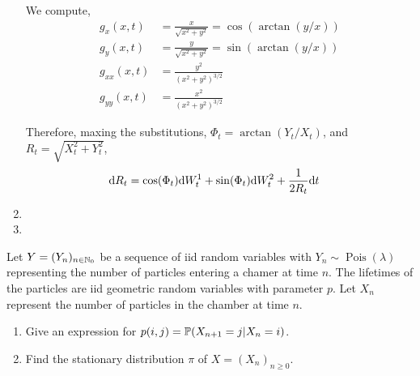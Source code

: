 \begin{solution}[Solution]
\begin{enumerate}[label=(\alph*)]
        We compute,
        \begin{align*}
            g_x(x,t) &= \frac{x}{\sqrt{x^2+y^2}} = \cos(\arctan(y/x)) \\
            g_y(x,t) &= \frac{y}{\sqrt{x^2+y^2}} = \sin(\arctan(y/x)) \\
            g_{xx}(x,t) &= \frac{y^2}{(x^2+y^2)^{3/2}} \\
            g_{yy}(x,t) &= \frac{x^2}{(x^2+y^2)^{3/2}}
        \end{align*}
        
        Therefore, maxing the substitutions, \( \Phi_t = \arctan(Y_t/X_t) \), and \( R_t = \sqrt{X_t^2+Y_t^2}  \),
        \begin{align*}
            \mathrm{d} R_t &= \cos(\Phi_t)\mathrm{d} W_t^1 + \sin(\Phi_t) \mathrm{d} W_t^2 + \frac{1}{2R_t} \mathrm{d} t
        \end{align*}


    \item
    \item 

\end{enumerate}
\end{solution}


\begin{problem}
Let \( Y = (Y_n)_{n\in\mathbb{N}_0} \) be a sequence of iid random variables with \( Y_n\sim \operatorname{Pois}(\lambda) \) representing the number of particles entering a chamer at time \( n \). The lifetimes of the particles are iid geometric random variables with parameter \( p \). Let \( X_n \) represent the number of particles in the chamber at time \( n \).
\begin{enumerate}[nolistsep,label=(\alph*)]
    \item Give an expression for \( p(i,j) = \mathbb{P}(X_{n+1} = j | X_n = i) \).
    \item Find the stationary distribution \( \pi \) of \( X = (X_n)_{n\geq 0} \).
\end{enumerate}
\end{problem}

